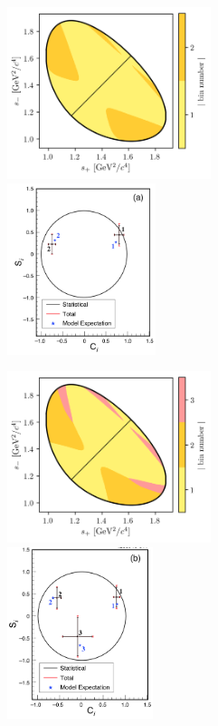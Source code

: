 \begin{figure}[p]
    \centering
    \begin{subfigure}{\columnwidth}
        \centering
        \includegraphics[height=5cm]{figures/theory/binnings/KsKK_2bins.png}
        \includegraphics[height=5cm]{figures/theory/kskk_cisi_2.png}
        \caption{}
        \label{fig:kskk_bins_2}
    \end{subfigure}
    \begin{subfigure}{\columnwidth}
        \centering
        \includegraphics[height=5cm]{figures/theory/binnings/KsKK_3bins.png}
        \includegraphics[height=5cm]{figures/theory/kskk_cisi_3.png}

\end{subfigure}
\end{figure}
